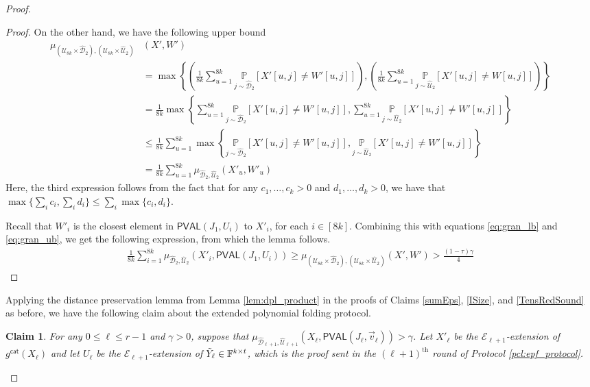 \documentclass[11pt]{article}
\newtheorem{claim}[theorem]{Claim}
\newcommand{\PVAL}{\mathsf{PVAL}}
\newcommand{\F}{\mathbb{F}}
\newcommand{\sU}{\mathcal{U}}
\newcommand{\sD}{\mathcal{D}}
\begin{document}
\begin{proof}
\begin{proof}
    On the other hand, we have the following upper bound
    \begin{equation}
    \label{eq:gran_ub}
        \begin{split}
            \mu_{(\sU_{8k} \times \widehat{\sD}_{2}), (\sU_{8k} \times \widehat{\sU}_{2})} &(X', W') 
            \\
            &= \max \left\{ \left( \frac{1}{8k} \sum_{u=1}^{8k} \underset{j \sim \widehat{\sD}_{2}}{\mathbb{P}} \left[ X'[u,j] \neq W'[u,j] \right] \right), \left( \frac{1}{8k} \sum_{u=1}^{8k} \underset{j \sim \widehat{\sU}_{2}}{\mathbb{P}} \left[ X'[u,j] \neq W[u,j] \right] \right) \right\}\\
            &= \frac{1}{8k}\max \left\{  \sum_{u=1}^{8k} \underset{j \sim \widehat{\sD}_{2}}{\mathbb{P}} \left[ X'[u,j] \neq W'[u,j] \right], \sum_{u=1}^{8k} \underset{j \sim \widehat{\sU}_{2}}{\mathbb{P}} \left[ X'[u,j] \neq W'[u,j] \right] \right\} \\
            &\leq \frac{1}{8k} \sum_{u=1}^{8k} \max \left\{ \underset{j \sim \widehat{\sD}_{2}}{\mathbb{P}} \left[ X'[u,j] \neq W'[u,j] \right],\underset{j \sim \widehat{\sU}_{2}}{\mathbb{P}} \left[ X'[u,j] \neq W'[u,j] \right] \right\} \\
            &= \frac{1}{8k} \sum_{u=1}^{8k} \mu_{\widehat{\sD}_2, \widehat{\sU}_2} (X'_u, W'_u)
        \end{split}
    \end{equation}
    Here, the third expression follows from the fact that for any $c_1, \dots, c_k > 0$ and $d_1, \dots, d_k > 0$, we have that $\max \{\sum_i c_i, \sum_i d_i\} \leq \sum_i \max \{c_i,d_i\}$.
    
    Recall that $W'_i$ is the closest element in $\PVAL(J_{1}, U_{i})$ to $X'_i$, for each $i \in [8k]$. Combining this with equations \ref{eq:gran_lb} and \ref{eq:gran_ub}, we get the following expression, from which the lemma follows.
    \begin{equation*}
    \begin{split}
        \frac{1}{8k} \sum_{i=1}^{8k} \mu_{\widehat{\sD}_2, \widehat{\sU}_2} (X'_i, \PVAL(J_{1}, U_{i})) \geq \mu_{(\sU_{8k} \times \widehat{\sD}_{2}), (\sU_{8k} \times \widehat{\sU}_{2})} (X', W') > \frac{(1-\tau)\gamma}{4}
    \end{split}
    \end{equation*}
\end{proof}

Applying the distance preservation lemma from Lemma \ref{lem:dpl_product} in the proofs of Claims \ref{sumEps}, \ref{ISize}, and \ref{TensRedSound} as before, we have the following claim about the extended polynomial folding protocol.
\begin{claim}
\label{clm:good_folding_extended}
For any $0 \leq \ell \leq r-1$ and $\gamma > 0$, suppose that $\mu_{\widehat{\sD}_{\ell+1},\widehat{\sU}_{\ell+1}}(X_\ell,\PVAL(J_\ell,\vec{v}_\ell))>\gamma$. Let $X'_\ell$ be the $\mathcal{E}_{\ell+1}$-extension of $g^{\mathsf{cat}}(X_\ell)$ and let $U_\ell$ be the $\mathcal{E}_{\ell+1}$-extension of $\Tilde{Y}_\ell \in \F^{k \times t}$, which is the proof sent in the $(\ell+1)^{\text{th}}$ round of Protocol \ref{pcl:epf_protocol}. 


\end{claim}
\end{proof}
\end{document}
